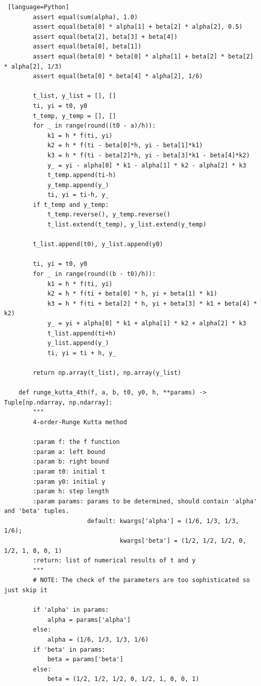 \documentclass[a4paper]{article}
\begin{document}
\begin{appendices}
\begin{lstlisting} [language=Python]
        assert equal(sum(alpha), 1.0)
        assert equal(beta[0] * alpha[1] + beta[2] * alpha[2], 0.5)
        assert equal(beta[2], beta[3] + beta[4])
        assert equal(beta[0], beta[1])
        assert equal(beta[0] * beta[0] * alpha[1] + beta[2] * beta[2] * alpha[2], 1/3)
        assert equal(beta[0] * beta[4] * alpha[2], 1/6)
    
        t_list, y_list = [], []
        ti, yi = t0, y0
        t_temp, y_temp = [], []
        for _ in range(round((t0 - a)/h)):
            k1 = h * f(ti, yi)
            k2 = h * f(ti - beta[0]*h, yi - beta[1]*k1)
            k3 = h * f(ti - beta[2]*h, yi - beta[3]*k1 - beta[4]*k2)
            y_ = yi - alpha[0] * k1 - alpha[1] * k2 - alpha[2] * k3
            t_temp.append(ti-h)
            y_temp.append(y_)
            ti, yi = ti-h, y_
        if t_temp and y_temp:
            t_temp.reverse(), y_temp.reverse()
            t_list.extend(t_temp), y_list.extend(y_temp)
    
        t_list.append(t0), y_list.append(y0)
    
        ti, yi = t0, y0
        for _ in range(round((b - t0)/h)):
            k1 = h * f(ti, yi)
            k2 = h * f(ti + beta[0] * h, yi + beta[1] * k1)
            k3 = h * f(ti + beta[2] * h, yi + beta[3] * k1 + beta[4] * k2)
            y_ = yi + alpha[0] * k1 + alpha[1] * k2 + alpha[2] * k3
            t_list.append(ti+h)
            y_list.append(y_)
            ti, yi = ti + h, y_
    
        return np.array(t_list), np.array(y_list)
    
    def runge_kutta_4th(f, a, b, t0, y0, h, **params) -> Tuple[np.ndarray, np.ndarray]:
        """
        4-order-Runge Kutta method
    
        :param f: the f function
        :param a: left bound
        :param b: right bound
        :param t0: initial t
        :param y0: initial y
        :param h: step length
        :param params: params to be determined, should contain 'alpha' and 'beta' tuples.
                       default: kwargs['alpha'] = (1/6, 1/3, 1/3, 1/6);
                                kwargs['beta'] = (1/2, 1/2, 1/2, 0, 1/2, 1, 0, 0, 1)
        :return: list of numerical results of t and y
        """
        # NOTE: The check of the parameters are too sophisticated so just skip it
    
        if 'alpha' in params:
            alpha = params['alpha']
        else:
            alpha = (1/6, 1/3, 1/3, 1/6)
        if 'beta' in params:
            beta = params['beta']
        else:
            beta = (1/2, 1/2, 1/2, 0, 1/2, 1, 0, 0, 1)
    

\end{lstlisting}
\end{appendices}
\end{document}
